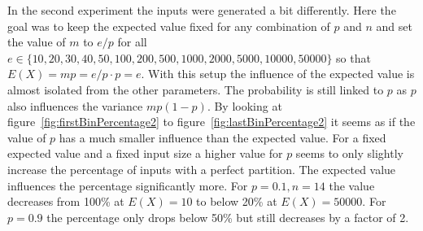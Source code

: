 In the second experiment the inputs were generated a bit differently. 
Here the goal was to keep the expected value fixed for any combination of $p$ and $n$ and set the value of $m$ to $e/p$ for all $e \in \{10, 20, 30, 40, 50, 100, 200, 500, 1000, 2000, 5000, 10000, 50000\}$ so that $E(X)=mp=e/p\cdot p=e$.
With this setup the influence of the expected value is almost isolated from the other parameters.
The probability is still linked to $p$ as $p$ also influences the variance $mp(1-p)$.
By looking at figure~\ref{fig:firstBinPercentage2} to figure~\ref{fig:lastBinPercentage2} it seems as if the value of $p$ has a much smaller influence than the expected value.
For a fixed expected value and a fixed input size a higher value for $p$ seems to only slightly increase the percentage of inputs with a perfect partition.
The expected value influences the percentage significantly more.
For $p=0.1, n=14$ the value decreases from 100\% at $E(X)=10$ to below 20\% at $E(X)=50000$.
For $p=0.9$ the percentage only drops below 50\% but still decreases by a factor of 2.

